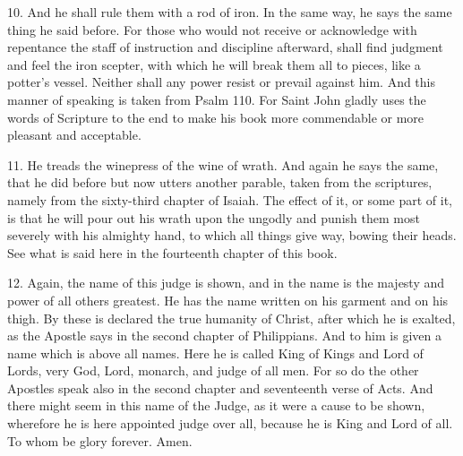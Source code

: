 10. And he shall rule them with a rod of iron. In the same way, he says the same thing he said before. For those who would not receive or acknowledge with repentance the staff of instruction and discipline afterward, shall find judgment and feel the iron scepter, with which he will break them all to pieces, like a potter’s vessel. Neither shall any power resist or prevail against him. And this manner of speaking is taken from Psalm 110. For Saint John gladly uses the words of Scripture to the end to make his book more commendable or more pleasant and acceptable.

11. He treads the winepress of the wine of wrath. And again he says the same, that he did before but now utters another parable, taken from the scriptures, namely from the sixty-third chapter of Isaiah. The effect of it, or some part of it, is that he will pour out his wrath upon the ungodly and punish them most severely with his almighty hand, to which all things give way, bowing their heads. See what is said here in the fourteenth chapter of this book.

12. Again, the name of this judge is shown, and in the name is the majesty and power of all others greatest. He has the name written on his garment and on his thigh. By these is declared the true humanity of Christ, after which he is exalted, as the Apostle says in the second chapter of Philippians. And to him is given a name which is above all names. Here he is called King of Kings and Lord of Lords, very God, Lord, monarch, and judge of all men. For so do the other Apostles speak also in the second chapter and seventeenth verse of Acts. And there might seem in this name of the Judge, as it were a cause to be shown, wherefore he is here appointed judge over all, because he is King and Lord of all. To whom be glory forever. Amen.
